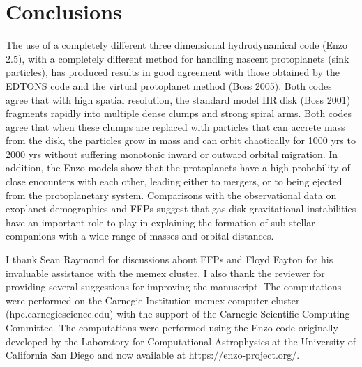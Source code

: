 \documentclass[12pt,preprint]{aastex}
\begin{document}
\section{Conclusions}

 The use of a completely different three dimensional hydrodynamical code (Enzo 2.5), with a completely
different method for handling nascent protoplanets (sink particles), has produced results in good 
agreement with those obtained by the EDTONS code and the virtual protoplanet method (Boss 2005).
Both codes agree that with high spatial resolution, the standard model HR disk (Boss 2001)
fragments rapidly into multiple dense clumps and strong spiral arms. Both codes agree that
when these clumps are replaced with particles that can accrete mass from the disk, the
particles grow in mass and can orbit chaotically for 1000 yrs to 2000 yrs without suffering
monotonic inward or outward orbital migration. In addition, the Enzo models show that the
protoplanets have a high probability of close encounters with each other, leading either to
mergers, or to being ejected from the protoplanetary system. Comparisons with the observational
data on exoplanet demographics and FFPs suggest that gas disk gravitational instabilities
have an important role to play in explaining the formation of sub-stellar companions with a
wide range of masses and orbital distances.

\acknowledgments

 I thank Sean Raymond for discussions about FFPs and Floyd Fayton for his invaluable assistance with 
the memex cluster. I also thank the reviewer for providing several suggestions for improving
the manuscript. The computations were performed on the Carnegie Institution memex computer
cluster (hpc.carnegiescience.edu) with the support of the Carnegie Scientific
Computing Committee. The computations were performed using the Enzo code
originally developed by the Laboratory for Computational Astrophysics at the University 
of California San Diego and now available at https://enzo-project.org/.
\end{document}
